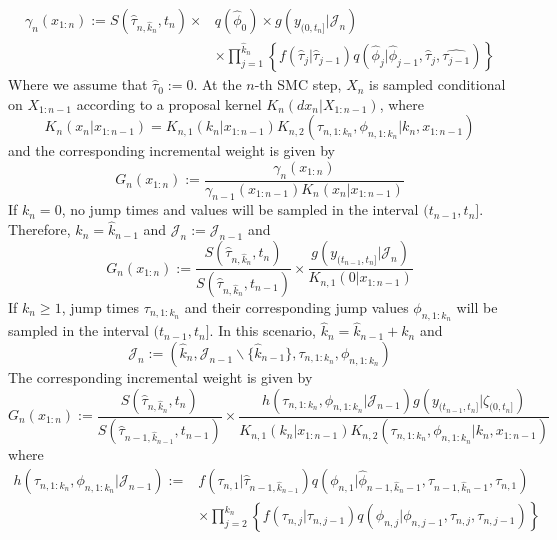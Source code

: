 \documentclass[12pt,a4paper]{article}
\begin{document}
\begin{equation}
    \label{def:VRPF_Target}
    \begin{split}
    \gamma_n(x_{1:n}) := S\left(\hat{\tau}_{n,\hat{k}_n},t_n\right)\times & q\left(\hat{\phi}_0\right) \times g(y_{(0,t_n]}|\mathcal{J}_n)\\
    &\times \prod_{j=1}^{\hat{k}_n} \left\{f\left(\hat{\tau}_j|\hat{\tau}_{j-1}\right)q\left(\hat{\phi}_{j}|\hat{\phi}_{j-1},\hat{\tau}_j,\hat{\tau_{j-1}}\right)\right\}
    \end{split}
\end{equation}
Where we assume that $\hat{\tau}_0 := 0$. At the $n$-th SMC step, $X_n$ is sampled conditional on $X_{1:n-1}$ according to a proposal kernel $K_n\left(dx_n|X_{1:n-1}\right)$, where 
\begin{equation}
    \label{VRPF_Proposal}
    K_n\left(x_n|x_{1:n-1}\right) = K_{n,1}\left(k_n|x_{1:n-1}\right)K_{n,2}\left(\tau_{n,1:k_n},\phi_{n,1:k_n}|k_n,x_{1:n-1}\right)
\end{equation}
and the corresponding incremental weight is given by 
$$G_{n}\left(x_{1:n}\right) := \frac{\gamma_{n}\left(x_{1:n}\right)}{\gamma_{n-1}\left(x_{1:n-1}\right)K_{n}(x_n|x_{1:n-1})}$$
If $k_n = 0$, no jump times and values will be sampled in the interval $(t_{n-1},t_n]$. Therefore, $\hat{k}_n = \hat{k}_{n-1}$ and $\mathcal{J}_n := \mathcal{J}_{n-1}$ and 
\begin{equation}
\label{VRPFIncrement:0-jumps}
    G_n(x_{1:n}) := \frac{S\left(\hat{\tau}_{n,\hat{k}_n},t_n\right)}{S\left(\hat{\tau}_{n,\hat{k}_n},t_{n-1}\right)} \times \frac{g\left(y_{(t_{n-1},t_n]}|\mathcal{J}_n\right)}{K_{n,1}(0|x_{1:n-1})}
\end{equation}
If $k_n \geq 1$, jump times $\tau_{n,1:k_n}$ and their corresponding jump values $\phi_{n,1:k_n}$ will be sampled in the interval $(t_{n-1},t_n]$. In this scenario, $\hat{k}_n = \hat{k}_{n-1}+k_n$ and $$\mathcal{J}_n := \left(\hat{k}_n,\mathcal{J}_{n-1}\backslash\{\hat{k}_{n-1}\},\tau_{n,1:k_n},\phi_{n,1:k_n}\right)$$
The corresponding incremental weight is given by 
\begin{equation}
    \label{VRPFIncrement:n-jumps}
    G_n\left(x_{1:n}\right) := \frac{S\left(\hat{\tau}_{n,\hat{k}_n},t_n\right)}{S\left(\hat{\tau}_{n-1,\hat{k}_{n-1}},t_{n-1}\right)} \times \frac{h\left(\tau_{n,1:k_n},\phi_{n,1:k_n}|\mathcal{J}_{n-1}\right)g\left(y_{(t_{n-1},t_n]}|\zeta_{(0,t_n]}\right)}{K_{n,1}(k_n|x_{1:n-1})K_{n,2}(\tau_{n,1:k_n},\phi_{n,1:k_n}|k_n,x_{1:n-1})}
\end{equation}
where 
\begin{equation*}
\begin{split}
    h\left(\tau_{n,1:k_n},\phi_{n,1:k_n}|\mathcal{J}_{n-1}\right) := &f\left(\tau_{n,1}| \hat{\tau}_{n-1,\hat{k}_{n-1}}\right) q\left(\phi_{n,1}|\hat{\phi}_{n-1,\hat{k}_n-1},\hat{\tau}_{n-1,\hat{k}_n-1},\tau_{n,1}\right)\\
    & \times \prod_{j=2}^{k_n} \left\{f(\tau_{n,j}|\tau_{n,j-1})q(\phi_{n,j}|\phi_{n,j-1},\tau_{n,j},\tau_{n,j-1})\right\}
\end{split}
\end{equation*}
\end{document}
